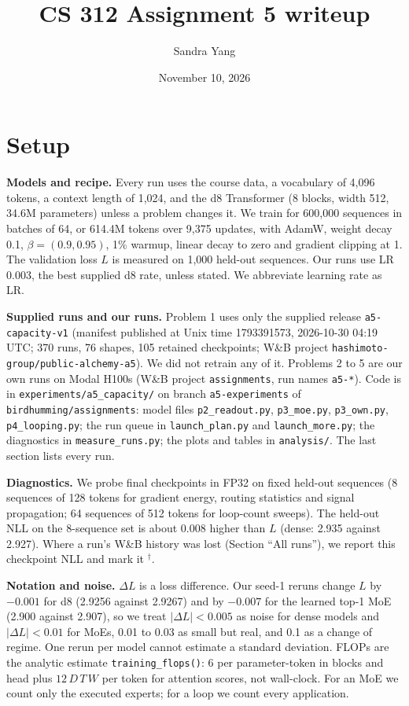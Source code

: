 \documentclass[10pt,letterpaper]{article}
\title{\vspace{-2em}CS 312 Assignment 5 writeup}
\author{Sandra Yang}
\date{November 10, 2026}
\newcommand{\lead}[1]{\textbf{#1}}
\begin{document}
\maketitle
\vspace{-1.5em}

\section*{Setup}

\lead{Models and recipe.} Every run uses the course data, a vocabulary of 4,096 tokens, a context length of 1,024, and the d8 Transformer (8 blocks, width 512, 34.6M parameters) unless a problem changes it. We train for 600,000 sequences in batches of 64, or 614.4M tokens over 9,375 updates, with AdamW, weight decay 0.1, $\beta=(0.9,0.95)$, 1\% warmup, linear decay to zero and gradient clipping at 1. The validation loss $L$ is measured on 1,000 held-out sequences. Our runs use LR 0.003, the best supplied d8 rate, unless stated. We abbreviate learning rate as LR.

\lead{Supplied runs and our runs.} Problem 1 uses only the supplied release \texttt{a5-capacity-v1} (manifest published at Unix time 1793391573, 2026-10-30 04:19 UTC; 370 runs, 76 shapes, 105 retained checkpoints; W\&B project \texttt{hashimoto-group/public-alchemy-a5}). We did not retrain any of it. Problems 2 to 5 are our own runs on Modal H100s (W\&B project \texttt{assignments}, run names \texttt{a5-*}). Code is in \texttt{experiments/a5\_capacity/} on branch \texttt{a5-experiments} of \texttt{birdhumming/assignments}: model files \texttt{p2\_readout.py}, \texttt{p3\_moe.py}, \texttt{p3\_own.py}, \texttt{p4\_looping.py}; the run queue in \texttt{launch\_plan.py} and \texttt{launch\_more.py}; the diagnostics in \texttt{measure\_runs.py}; the plots and tables in \texttt{analysis/}. The last section lists every run.

\lead{Diagnostics.} We probe final checkpoints in FP32 on fixed held-out sequences (8 sequences of 128 tokens for gradient energy, routing statistics and signal propagation; 64 sequences of 512 tokens for loop-count sweeps). The held-out NLL on the 8-sequence set is about 0.008 higher than $L$ (dense: 2.935 against 2.927). Where a run's W\&B history was lost (Section ``All runs''), we report this checkpoint NLL and mark it $^\dagger$.

\lead{Notation and noise.} $\Delta L$ is a loss difference. Our seed-1 reruns change $L$ by $-0.001$ for d8 (2.9256 against 2.9267) and by $-0.007$ for the learned top-1 MoE (2.900 against 2.907), so we treat $|\Delta L|<0.005$ as noise for dense models and $|\Delta L|<0.01$ for MoEs, 0.01 to 0.03 as small but real, and 0.1 as a change of regime. One rerun per model cannot estimate a standard deviation. FLOPs are the analytic estimate \texttt{training\_flops()}: 6 per parameter-token in blocks and head plus $12\,D\,T\,W$ per token for attention scores, not wall-clock. For an MoE we count only the executed experts; for a loop we count every application.
\end{document}
